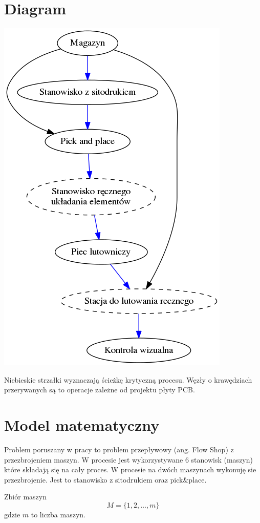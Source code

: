 \section{Diagram}
\includegraphics[scale=0.9]{chapters/graph.png}

Niebieskie strzałki wyznaczają ścieżkę krytyczną procesu.
Węzły o krawędziach przerywanych są to operacje zależne od projektu płyty PCB\@.



\section{Model matematyczny}
Problem poruszany w pracy to problem przepływowy (ang. Flow Shop) z przezbrojeniem maszyn.
W procesie jest wykorzystywane 6 stanowisk (maszyn) które składają się na cały proces.
W procesie na dwóch maszynach wykonuję sie przezbrojenie. Jest to stanowisko z sitodrukiem oraz pick\&place.

Zbiór maszyn
\begin{equation}
	M=\lbrace 1,2,\dots,m \rbrace
\end{equation}
gdzie $m$ to liczba maszyn.

